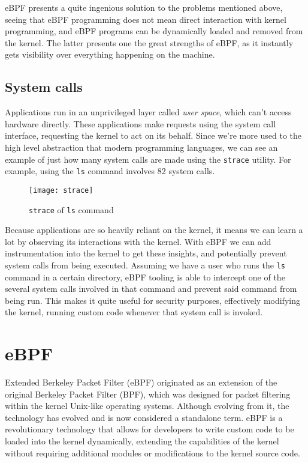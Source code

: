 eBPF presents a quite ingenious solution to the problems mentioned above, seeing that eBPF programming does not mean direct interaction with kernel programming, and eBPF programs can be dynamically loaded and removed from the kernel. The latter presents one the great strengths of eBPF, as it instantly gets visibility over everything happening on the machine.

\subsection{System calls}

Applications run in an unprivileged layer called \textit{user space}, which can't access hardware directly. These applications make requests using the system call interface, requesting the kernel to act on its behalf. Since we're more used to the high level abstraction that modern programming languages, we can see an example of just how many system calls are made using the \texttt{strace} utility. For example, using the \texttt{ls} command involves 82 system calls.
\begin{figure}[h]
    \caption{\texttt{strace} of \texttt{ls} command}
    \centering
    \texttt{[image: strace]}
\end{figure}

Because applications are so heavily reliant on the kernel, it means we can learn a lot by observing its interactions with the kernel. With eBPF we can add instrumentation into the kernel to get these insights, and potentially prevent system calls from being executed.
Assuming we have a user who runs the \texttt{ls} command in a certain directory, eBPF tooling is able to intercept one of the several system calls involved in that command and prevent said command from being run. This makes it quite useful for security purposes, effectively modifying the kernel, running custom code whenever that system call is invoked.

\section{eBPF}

Extended Berkeley Packet Filter (eBPF) \cite{learningeBPF} originated as an extension of the original Berkeley Packet Filter (BPF), which was designed for packet filtering within the kernel Unix-like operating systems. Although evolving from it, the technology has evolved and is now considered a standalone term. eBPF is a revolutionary technology that allows for developers to write custom code to be loaded into the kernel dynamically, extending the capabilities of the kernel without requiring additional modules or modifications to the kernel source code.


